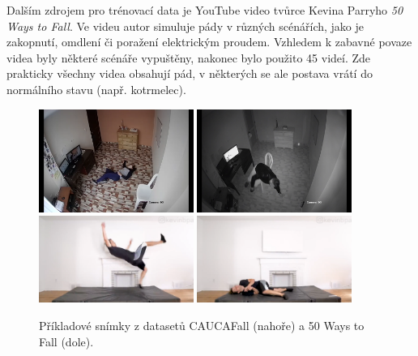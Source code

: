 Dalším zdrojem pro trénovací data je YouTube video tvůrce Kevina Parryho
\textit{50 Ways to Fall}. Ve videu autor simuluje pády v různých scénářích,
jako je zakopnutí, omdlení či poražení elektrickým proudem. Vzhledem k zabavné
povaze videa byly některé scénáře vypuštěny, nakonec bylo použito 45 videí. Zde
prakticky všechny videa obsahují pád, v některých se ale postava vrátí do
normálního stavu (např. kotrmelec).

\begin{figure}[]
    \centering
    \includegraphics[width=0.45\textwidth]{Figures/datasets_examples/cauca1.png}
    \includegraphics[width=0.45\textwidth]{Figures/datasets_examples/cauca2.png}
    \includegraphics[width=0.45\textwidth]{Figures/datasets_examples/fifty1.png}
    \includegraphics[width=0.45\textwidth]{Figures/datasets_examples/fifty2.png}
    \caption{Příkladové snímky z datasetů CAUCAFall (nahoře) a 50 Ways to Fall (dole).}
    \label{fig:datasets_examples}
\end{figure}

